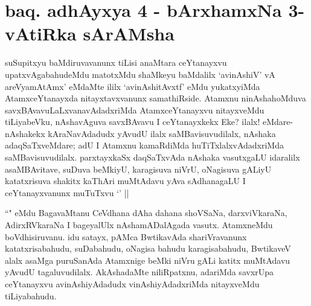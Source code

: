 \section*{baq. adhAyxya 4 - bArxhamxNa 3-vAtiRka sArAMsha}

\begin{artha}%
suSupitxyu baMdiruvavanunx tiLisi anaMtara ceYtanayxvu upatxvAgabahudeMdu matotxMdu shaMkeyu baMdalilx `avinAshiV' vA areV\s yamAtAmx' eMdaMte ililx `avinAshitAvxtf' eMdu yukatxyiMda AtamxceYtanayxda nitayxtavxvanunx samathiRside. Atamxnu ninAshahoMduva savxBAvavuLaLxvanavAdadxriMda AtamxceYtanayxvu nitayxveMdu tiLiyabeVku, nAshavAguva savxBAvavu I ceYtanayxkekx Eke? ilalx! eMdare- nAshakekx kAraNavAdadudx yAvudU ilalx saMBavisuvudilalx, nAshaka adaqSaTxveMdare; adU I Atamxnu kamaRdiMda huTiTxlalxvAdadxriMda saMBavisuvudilalx. parxtayxkaSx daqSaTxvAda nAshaka vasutxgaLU idaralilx asaMBAvitave, suDuva beMkiyU, karagisuva niVrU, oNagisuva gALiyU katatxrisuva shakitx kaThAri muMtAdavu yAva sAdhanagaLU I ceYtanayxvanunx muTuTxvu `\stext ' ||
\end{artha}

\begin{artha}
``\stext " eMdu BagavaMtanu CeVdhana dAha dahana shoVSaNa, darxviVkaraNa, AdirxRVkaraNa I bageyalUlx nAshamADalAgada vasutx. AtamxneMdu boVdhisiruvanu. idu satayx, pAMca BwtikavAda shariVravanunx katatxrisabahudu, suDabahudu, oNagisa bahudu karagisabahudu, BwtikaveV alalx asaMga puruSanAda Atamxnige beMki niVru gALi katitx muMtAdavu yAvudU tagaluvudilalx. AkAshadaMte niliRpatxnu, adariMda savxrUpa ceYtanayxvu avinAshiyAdadudx vinAshiyAdadxriMda nitayxveMdu tiLiyabahudu. 
\end{artha}


